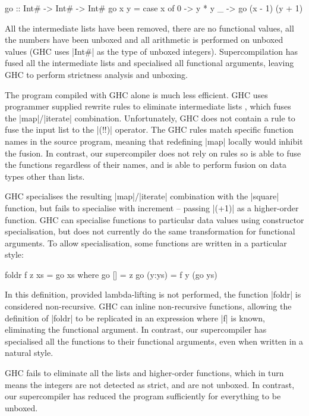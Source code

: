 \documentclass[draft]{sigplanconf}
\begin{document}
\begin{code}
go :: Int# -> Int# -> Int#
go x y = case x of
    0 -> y * y
    _ -> go (x - 1) (y + 1)
\end{code}

All the intermediate lists have been removed, there are no functional values, all the numbers have been unboxed and all arithmetic is performed on unboxed values (GHC uses |Int#| as the type of unboxed integers). Supercompilation has fused all the intermediate lists and specialised all functional arguments, leaving GHC to perform strictness analysis and unboxing.

The program compiled with GHC alone is much less efficient. GHC uses programmer supplied rewrite rules to eliminate intermediate lists \cite{spj:rules}, which fuses the |map|/|iterate| combination. Unfortunately, GHC does not contain a rule to fuse the input list to the |(!!)| operator. The GHC rules match specific function names in the source program, meaning that redefining |map| locally would inhibit the fusion. In contrast, our supercompiler does not rely on rules so is able to fuse the functions regardless of their names, and is able to perform fusion on data types other than lists.

GHC specialises the resulting |map|/|iterate| combination with the |square| function, but fails to specialise with increment -- passing |(+1)| as a higher-order function. GHC can specialise functions to particular data values using constructor specialisation, but does not currently do the same transformation for functional arguments. To allow specialisation, some functions are written in a particular style:

\begin{code}
foldr f z xs = go xs
    where  go []      = z
           go (y:ys)  = f y (go ys)
\end{code}

In this definition, provided lambda-lifting is not performed, the function |foldr| is considered non-recursive. GHC can inline non-recursive functions, allowing the definition of |foldr| to be replicated in an expression where |f| is known, eliminating the functional argument. In contrast, our supercompiler has specialised all the functions to their functional arguments, even when written in a natural style.

GHC fails to eliminate all the lists and higher-order functions, which in turn means the integers are not detected as strict, and are not unboxed. In contrast, our supercompiler has reduced the program sufficiently for everything to be unboxed.
\end{document}
